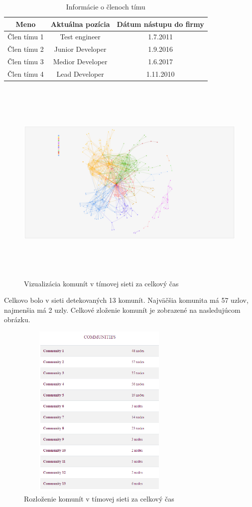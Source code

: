 \documentclass[slovak,master,public,dept460,male,cpdeclaration,oneside]{diploma}
\begin{document}
\begin{table}[h!]
\centering
\begin{tabular}{ c c c }
 Meno & Aktuálna pozícia &  Dátum nástupu do firmy \\ 
 \hline
 Člen tímu 1 & Test engineer  & 1.7.2011 \\  
 Člen tímu 2  & Junior Developer  & 1.9.2016  \\
 Člen tímu 3  & Medior Developer  & 1.6.2017 \\
 Člen tímu 4  & Lead Developer & 1.11.2010 \\
\end{tabular}
\caption{Informácie o členoch tímu}
\end{table} 

\begin{figure}[H]
\centering
\includegraphics[width=17cm, height=10cm]{figures/team_communities_celkovo}
\caption{Vizualizácia komunít v tímovej sieti za celkový čas}
\end{figure}

Celkovo bolo v sieti detekovaných 13 komunít. Najväčšia komunita má 57 uzlov, najmenšia má 2 uzly. Celkové zloženie komunít je zobrazené na nasledujúcom obrázku.

\begin{figure}[H]
\centering
\includegraphics[width=8cm, height=8.5cm]{figures/team_communities_tab_celkovo}
\caption{Rozloženie komunít v tímovej sieti za celkový čas}
\end{figure}
\end{document}
